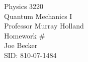 \begin{titlepage}
\setlength{\topmargin}{1.5in}
\begin{center}
\Huge{Physics 3220} \\
\LARGE{Quantum Mechanics I} \\
\Large{Professor Murray Holland} \\[1cm]

\huge{Homework \#\HWnum}\\[0.5cm]

\large{Joe Becker} \\
\large{SID: 810-07-1484} \\
\large{\due} 

\end{center}

\end{titlepage}

